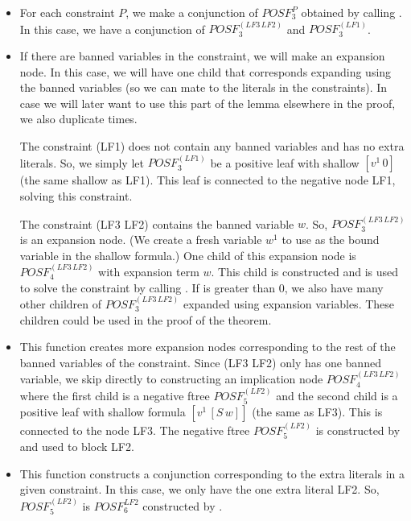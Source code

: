 \begin{enumerate}
\begin{itemize}
\item {\bf {}}  For each constraint $P$,
we make a conjunction of $POSF_3^P$ obtained by
calling .  In this case, we have a conjunction of
$POSF_3^{(LF3\, LF2)}$ and $POSF_3^{(LF1)}$.

\item {\bf {}}  If there are
banned variables in the constraint, we will make an expansion node.
In this case, we will have one child that corresponds expanding using
the banned variables (so we can mate to the literals in the constraints).
In case we will later want to use this part of the lemma elsewhere in the
proof, we also duplicate  times.

The constraint (LF1) does not contain any banned variables and has
no extra literals.  So, we simply let $POSF_3^{(LF1)}$ be a positive
leaf with shallow $[v^1\, 0]$ (the same shallow as LF1).
This leaf is connected to the negative node LF1, solving this constraint.

The constraint (LF3 LF2) contains the banned variable $w$.
So, $POSF_3^{(LF3\, LF2)}$ is an expansion node.  
(We create a fresh variable $w^1$ to use as the bound variable in the shallow formula.)
One child of this expansion node
is $POSF_4^{(LF3\, LF2)}$ with expansion term $w$.  This child is constructed
and is used to solve the constraint by calling
.  If  is
greater than $0$, we also have  many other children
of $POSF_3^{(LF3\, LF2)}$ expanded using expansion variables.  These children
could be used in the proof of the theorem.

\item {\bf {}}  This function
creates more expansion nodes corresponding to the rest of the banned variables
of the constraint.  Since (LF3 LF2) only has one banned variable, we
skip directly to constructing an implication node $POSF_4^{(LF3\, LF2)}$
where the first child is a negative ftree $POSF_5^{(LF2)}$ and the second
child is a positive leaf with shallow formula $[v^1\, [S\, w]]$ (the
same as LF3).  This is connected to the node LF3.
The negative ftree $POSF_5^{(LF2)}$ is constructed by
and used to block LF2.

\item {\bf {}}  This function constructs
a conjunction corresponding to the extra literals in a given constraint.
In this case, we only have the one extra literal LF2.  So, $POSF_5^{(LF2)}$
is $POSF_6^{LF2}$ constructed by .


\end{itemize}
\end{enumerate}
